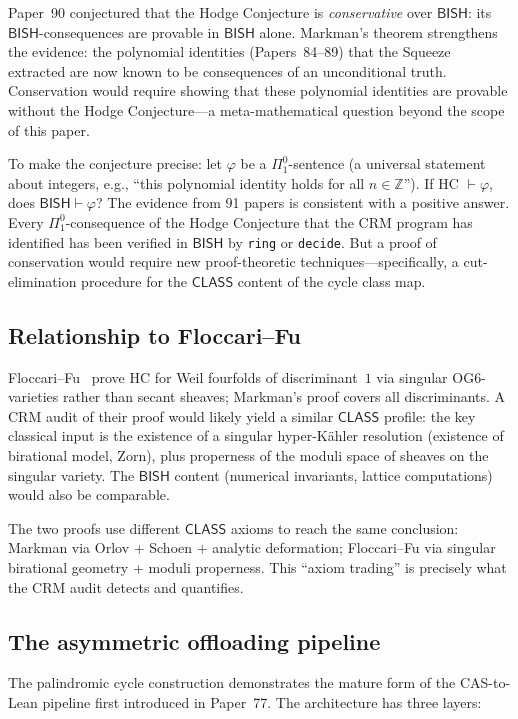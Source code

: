 \documentclass[11pt]{article}
\theoremstyle{plain}
\theoremstyle{definition}
\theoremstyle{remark}
\newcommand{\ZZ}{\mathbb{Z}}
\newcommand{\BISH}{\mathsf{BISH}}
\newcommand{\CLASS}{\mathsf{CLASS}}
\begin{document}
Paper~90 conjectured that the Hodge Conjecture is \emph{conservative}
over $\BISH$: its $\BISH$-consequences are provable in $\BISH$
alone.  Markman's theorem strengthens the evidence: the polynomial
identities (Papers~84--89) that the Squeeze extracted are now known
to be consequences of an unconditional truth.  Conservation would
require showing that these polynomial identities are provable without
the Hodge Conjecture---a meta-mathematical question beyond the scope
of this paper.

To make the conjecture precise: let $\varphi$ be a
$\Pi^0_1$-sentence (a universal statement about integers, e.g.,
``this polynomial identity holds for all $n \in \ZZ$'').  If
HC $\vdash \varphi$, does $\BISH \vdash \varphi$?  The evidence
from 91 papers is consistent with a positive answer.  Every
$\Pi^0_1$-consequence of the Hodge Conjecture that the CRM program
has identified has been verified in $\BISH$ by \texttt{ring} or
\texttt{decide}.  But a proof of conservation would require new
proof-theoretic techniques---specifically, a cut-elimination procedure
for the $\CLASS$ content of the cycle class map.

\subsection{Relationship to Floccari--Fu}

Floccari--Fu~\cite{floccari-fu2025} prove HC for Weil fourfolds
of discriminant~$1$ via singular OG6-varieties rather than
secant sheaves; Markman's proof covers all discriminants.  A CRM audit of their proof would likely yield
a similar $\CLASS$ profile: the key classical input is the existence
of a singular hyper-K\"ahler resolution (existence of birational
model, Zorn), plus properness of the moduli space of sheaves on the
singular variety.  The $\BISH$ content (numerical invariants,
lattice computations) would also be comparable.

The two proofs use different $\CLASS$ axioms to reach the same
conclusion: Markman via Orlov + Schoen + analytic deformation;
Floccari--Fu via singular birational geometry + moduli properness.
This ``axiom trading'' is precisely what the CRM audit detects and
quantifies.

\subsection{The asymmetric offloading pipeline}

The palindromic cycle construction demonstrates the mature form of
the CAS-to-Lean pipeline first introduced in Paper~77.  The
architecture has three layers:
\end{document}
